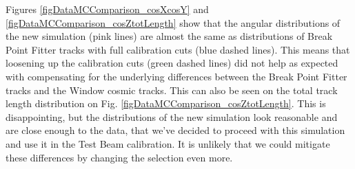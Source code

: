 Figures \ref{figDataMCComparison_cosXcosY} and \ref{figDataMCComparison_cosZtotLength} show that the angular distributions of the new simulation (pink lines) are almost the same as distributions of Break Point Fitter tracks with full calibration cuts (blue dashed lines). This means that loosening up the calibration cuts (green dashed lines) did not help as expected with compensating for the underlying differences between the Break Point Fitter tracks and the Window cosmic tracks. This can also be seen on the total track length distribution on Fig. \ref{figDataMCComparison_cosZtotLength}. This is disappointing, but the distributions of the new simulation look reasonable and are close enough to the data, that we've decided to proceed with this simulation and use it in the Test Beam calibration. It is unlikely that we could mitigate these differences by changing the selection even more.

